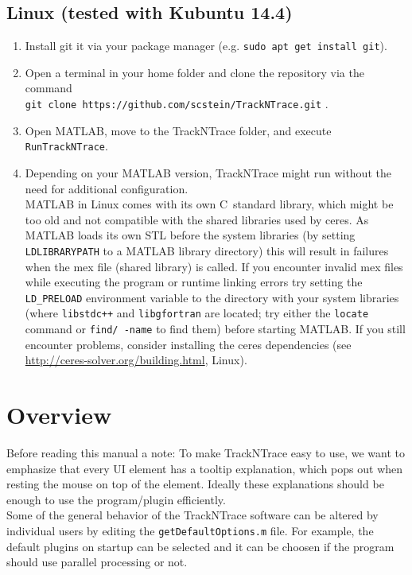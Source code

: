 \documentclass[11pt,onside]{report}
\numberwithin{equation}{chapter}
\def\CC{{C\nolinebreak[4]\hspace{-.05em}\raisebox{.3ex}{\tiny\bf ++}}}
\begin{document}
\subsection{Linux (tested with Kubuntu 14.4)}
\begin{enumerate}
\item Install git it via your package manager (e.g. \texttt{sudo apt get install git}).
\item Open a terminal in your home folder and clone the repository via the command \\ \texttt{git clone https://github.com/scstein/TrackNTrace.git} .
\item Open MATLAB, move to the TrackNTrace folder, and execute \texttt{RunTrackNTrace}.
\item Depending on your MATLAB version, TrackNTrace might run without the need for additional configuration.\\
MATLAB in Linux comes with its own \CC~standard library, which might be too old and not compatible with the shared libraries used by ceres. As MATLAB loads its own STL before the system libraries (by setting \texttt{LD\textunderscore LIBRARY\textunderscore PATH} to a MATLAB library directory) this will result  in failures when the mex file (shared library) is called. If you encounter invalid mex files while executing the program or runtime linking errors try setting the \texttt{LD\_PRELOAD} environment variable to the directory with your system libraries (where \texttt{libstdc++} and \texttt{libgfortran} are located; try either the \texttt{locate} command or \texttt{find/ -name} to find them) before starting MATLAB. If you still encounter problems, consider installing the ceres dependencies (see \url{http://ceres-solver.org/building.html}, Linux).
\end{enumerate}
\clearpage

\section{Overview}\label{sec:overview}
Before reading this manual a note: To make TrackNTrace easy to use, we want to emphasize that every UI element has a tooltip explanation, which pops out when resting the mouse on top of the element. Ideally these explanations should be enough to use the program/plugin efficiently.\\

Some of the general behavior of the TrackNTrace software can be altered by individual users by editing the \texttt{getDefaultOptions.m} file. For example, the default plugins on startup can be selected and it can be choosen if the program should use parallel processing or not.
\end{document}
